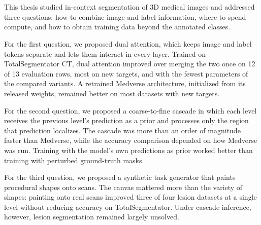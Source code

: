 \section{}\label{sec:conclusion}

This thesis studied in-context segmentation of 3D medical images and addressed
three questions: how to combine image and label information, where to spend
compute, and how to obtain training data beyond the annotated classes.

For the first question, we proposed dual attention, which keeps image and label
tokens separate and lets them interact in every layer. Trained on
TotalSegmentator CT, dual attention improved over merging the two once on 12
of 13 evaluation rows, most on new targets, and with the fewest parameters of
the compared variants. A retrained Medverse architecture, initialized from its
released weights, remained better on most datasets with new targets.

For the second question, we proposed a coarse-to-fine cascade in which each
level receives the previous level's prediction as a prior and processes only
the region that prediction localizes. The cascade was more than an order of
magnitude faster than Medverse, while the accuracy comparison depended on how
Medverse was run. Training with the model's own predictions as prior worked
better than training with perturbed ground-truth masks.

For the third question, we proposed a synthetic task generator that paints
procedural shapes onto scans. The canvas mattered more than the variety of
shapes: painting onto real scans improved three of four lesion datasets
at a single level without reducing accuracy on TotalSegmentator. Under cascade
inference, however, lesion segmentation remained largely unsolved.